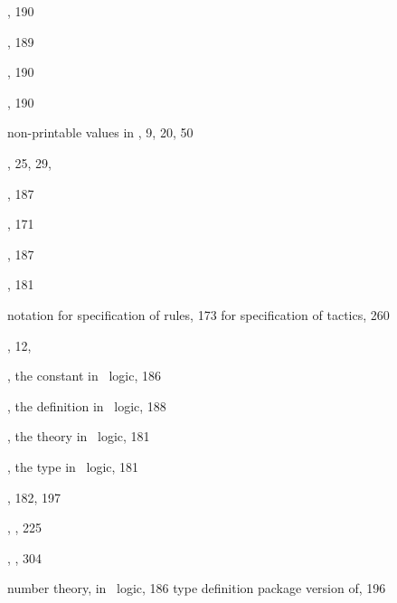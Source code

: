 \begin{theindex}
  \item {}, 190
  \item {}, 189
  \item {}, 190
  \item {}, 190
  \item non-printable values in \ML, 9, 20, 50
  \item {}, 25, 29, 
  \item {}, 187
  \item {}, 171
  \item {}, 187
  \item {}, 181
  \item notation
    \subitem for specification of rules, 173
    \subitem for specification of tactics, 260
  \item {}, 12, 
  \item {}, the constant in \HOL\ logic, 186
  \item {}, the definition in \HOL\ logic, 188
  \item {}, the theory in \HOL\ logic, 181
  \item {}, the type in \HOL\ logic, 181
  \item {}, 182, 197
  \item {}, , 225
  \item {}, , 304
  \item number theory, in \HOL\ logic, 186
    \subitem type definition package version of, 196

  \indexspace


\end{theindex}
